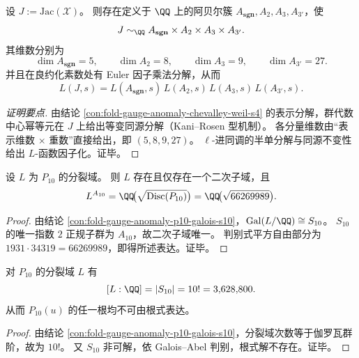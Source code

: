\begin{conclusion}\label{con:fold-gauge-anomaly-jacobian-equivariant-factorization}
设 \(J:=\mathrm{Jac}(\mathcal X)\)。
则存在定义于 \(\QQ\) 上的阿贝尔簇 \(A_{\mathbf{sgn}},A_2,A_3,A_{3'}\)，使
\[
J\sim_{\QQ}A_{\mathbf{sgn}}\times A_2\times A_3\times A_{3'}.
\]
其维数分别为
\[
\dim A_{\mathbf{sgn}}=5,\qquad \dim A_2=8,\qquad \dim A_3=9,\qquad \dim A_{3'}=27.
\]
并且在良约化素数处有 Euler 因子乘法分解，从而
\[
L(J,s)=L(A_{\mathbf{sgn}},s)\,L(A_2,s)\,L(A_3,s)\,L(A_{3'},s).
\]
\end{conclusion}
\begin{proof}[证明要点]
由结论 \ref{con:fold-gauge-anomaly-chevalley-weil-s4} 的表示分解，群代数中心幂等元在 \(J\) 上给出等变同源分解（Kani--Rosen 型机制）。
各分量维数由“表示维数 \(\times\) 重数”直接给出，即 \((5,8,9,27)\)。
\(\ell\)-进同调的半单分解与同源不变性给出 \(L\)-函数因子化。证毕。
\end{proof}

\begin{corollary}[分裂域的唯一二次子域]\label{cor:fold-gauge-anomaly-p10-unique-quadratic-subfield}
设 \(L\) 为 \(P_{10}\) 的分裂域。
则 \(L\) 存在且仅存在一个二次子域，且
\[
L^{A_{10}}=\QQ\!\bigl(\sqrt{\mathrm{Disc}(P_{10})}\bigr)=\QQ\!\bigl(\sqrt{66269989}\bigr).
\]
\end{corollary}
\begin{proof}
由结论 \ref{con:fold-gauge-anomaly-p10-galois-s10}，\(\mathrm{Gal}(L/\QQ)\cong S_{10}\)。
\(S_{10}\) 的唯一指数 \(2\) 正规子群为 \(A_{10}\)，故二次子域唯一。
判别式平方自由部分为 \(1931\cdot 34319=66269989\)，即得所述表达。证毕。
\end{proof}

\begin{corollary}[分裂域次数与分支根不可根式性]\label{cor:fold-gauge-anomaly-p10-degree-and-unsolvability}
对 \(P_{10}\) 的分裂域 \(L\) 有
\[
[L:\QQ]=|S_{10}|=10!=3{,}628{,}800.
\]
从而 \(P_{10}(u)\) 的任一根均不可由根式表达。
\end{corollary}
\begin{proof}
由结论 \ref{con:fold-gauge-anomaly-p10-galois-s10}，分裂域次数等于伽罗瓦群阶，故为 \(10!\)。
又 \(S_{10}\) 非可解，依 Galois--Abel 判别，根式解不存在。证毕。
\end{proof}

